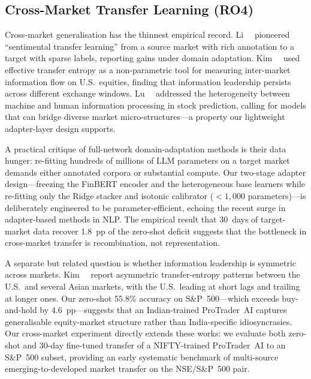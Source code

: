 \subsection{Cross-Market Transfer Learning (RO4)}

Cross-market generalisation has the thinnest empirical record. Li~\etal~\cite{li2018sentimental}
pioneered ``sentimental transfer learning'' from a source market with rich
annotation to a target with sparse labels, reporting gains under domain
adaptation. Kim~\etal~\cite{kim2020predicting} used effective transfer entropy
as a non-parametric tool for measuring inter-market information flow on U.S.\ equities,
finding that information leadership persists across different exchange windows.
Lu~\etal~\cite{lu2024bridging} addressed the heterogeneity between machine and
human information processing in stock prediction, calling for models that can
bridge diverse market micro-structures---a property our lightweight adapter-layer
design supports.

A practical critique of full-network domain-adaptation methods is their data
hunger: re-fitting hundreds of millions of LLM parameters on a target market
demands either annotated corpora or substantial compute. Our two-stage
adapter design---freezing the FinBERT encoder and the heterogeneous base
learners while re-fitting only the Ridge stacker and isotonic calibrator
($<\!1{,}000$ parameters)---is deliberately engineered to be parameter-efficient,
echoing the recent surge in adapter-based methods in NLP. The empirical
result that 30~days of target-market data recover 1.8~pp of the zero-shot
deficit suggests that the bottleneck in cross-market transfer is recombination,
not representation.

A separate but related question is whether information leadership is symmetric
across markets. Kim~\etal~\cite{kim2020predicting} report asymmetric
transfer-entropy patterns between the U.S.\ and several Asian markets, with
the U.S.\ leading at short lags and trailing at longer ones. Our zero-shot
55.8\% accuracy on S\&P~500---which exceeds buy-and-hold by 4.6~pp---suggests
that an Indian-trained ProTrader~AI captures generalisable equity-market
structure rather than India-specific idiosyncrasies. Our cross-market
experiment directly extends these works: we evaluate both zero-shot and
30-day fine-tuned transfer of a NIFTY-trained ProTrader~AI to an S\&P~500
subset, providing an early systematic benchmark of multi-source emerging-to-developed
market transfer on the NSE/S\&P~500 pair.


